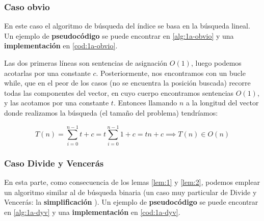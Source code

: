 \subsubsection{Caso obvio} \label{sec:1a-obvio}

En este caso el algoritmo de búsqueda del índice se basa en la búsqueda lineal. Un ejemplo de \textbf{pseudocódigo} 
se puede encontrar en \ref{alg:1a-obvio} y una \textbf{implementación} en \ref{cod:1a-obvio}.





 


Las dos primeras líneas son sentencias de asignación $O(1)$, luego podemos acotarlas por una constante $c$. 
Posteriormente, nos encontramos con un bucle while, que en el peor de los casos (no se encuentra la posición buscada) 
recorre todas las componentes del vector, en cuyo cuerpo encontramos sentencias $O(1)$, y las acotamos por una constante $t$.
Entonces llamando $n$ a la longitud del vector donde realizamos la búsqueda (el tamaño del problema) tendríamos: 

\begin{equation}
    T(n) = \sum_{i=0}^{n-1} t + c = t \sum_{i=0}^{n-1} 1 + c = tn + c \implies \boxed{T(n) \in O(n)}
\end{equation}

\subsubsection{Caso Divide y Vencerás} \label{sec:1a-dyv}

En esta parte, como consecuencia de los lemas \ref{lem:1} y \ref{lem:2}, podemos emplear un 
algoritmo similar al de búsqueda binaria (un caso muy particular de Divide y Vencerás: la
\textbf{simplificación} \cite{Verdegay2017}). Un ejemplo de \textbf{pseudocódigo} se puede encontrar en \ref{alg:1a-dyv} y
una \textbf{implementación} en \ref{cod:1a-dyv}.


